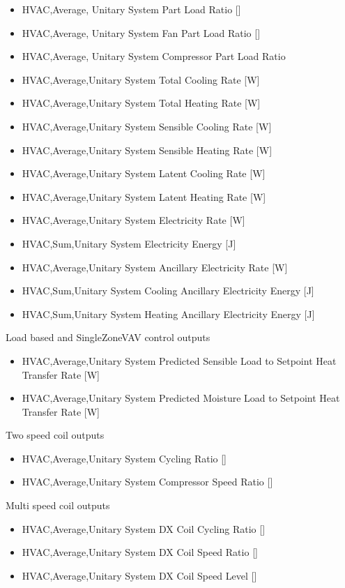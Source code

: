 \begin{itemize}
\item
  HVAC,Average, Unitary System Part Load Ratio {[]}
\item
  HVAC,Average, Unitary System Fan Part Load Ratio {[]}
\item
  HVAC,Average, Unitary System Compressor Part Load Ratio
\item
  HVAC,Average,Unitary System Total Cooling Rate {[}W{]}
\item
  HVAC,Average,Unitary System Total Heating Rate {[}W{]}
\item
  HVAC,Average,Unitary System Sensible Cooling Rate {[}W{]}
\item
  HVAC,Average,Unitary System Sensible Heating Rate {[}W{]}
\item
  HVAC,Average,Unitary System Latent Cooling Rate {[}W{]}
\item
  HVAC,Average,Unitary System Latent Heating Rate {[}W{]}
\item
  HVAC,Average,Unitary System Electricity Rate {[}W{]}
\item
  HVAC,Sum,Unitary System Electricity Energy {[}J{]}
\item
  HVAC,Average,Unitary System Ancillary Electricity Rate {[}W{]}
\item
  HVAC,Sum,Unitary System Cooling Ancillary Electricity Energy {[}J{]}
\item
  HVAC,Sum,Unitary System Heating Ancillary Electricity Energy {[}J{]}
\end{itemize}

Load based and SingleZoneVAV control outputs
\begin{itemize}
\tightlist
\item
HVAC,Average,Unitary System Predicted Sensible Load to Setpoint Heat Transfer Rate [W]
\item
HVAC,Average,Unitary System Predicted Moisture Load to Setpoint Heat Transfer Rate [W]
\end{itemize}

Two speed coil outputs

\begin{itemize}
\tightlist
\item
  HVAC,Average,Unitary System Cycling Ratio {[]}
\item
  HVAC,Average,Unitary System Compressor Speed Ratio {[]}
\end{itemize}

Multi speed coil outputs

\begin{itemize}
\item
  HVAC,Average,Unitary System DX Coil Cycling Ratio {[]}
\item
  HVAC,Average,Unitary System DX Coil Speed Ratio {[]}
\item
  HVAC,Average,Unitary System DX Coil Speed Level {[]}
\end{itemize}

